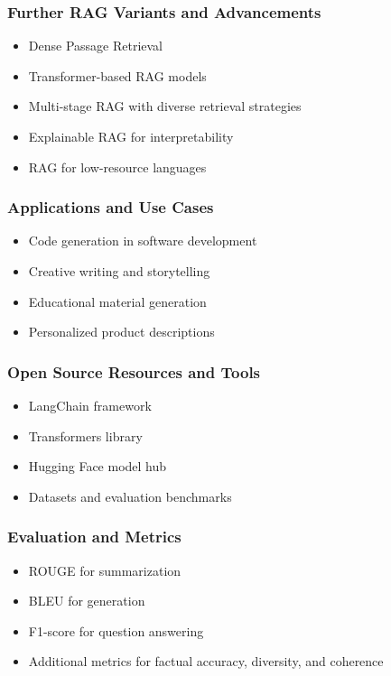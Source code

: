 \begin{frame}[fragile]\frametitle{Further RAG Variants and Advancements}

\begin{itemize}
\item Dense Passage Retrieval
\item Transformer-based RAG models
\item Multi-stage RAG with diverse retrieval strategies
\item Explainable RAG for interpretability
\item RAG for low-resource languages
\end{itemize}	

\end{frame}

\begin{frame}[fragile]\frametitle{Applications and Use Cases}

\begin{itemize}
\item Code generation in software development
\item Creative writing and storytelling
\item Educational material generation
\item Personalized product descriptions
\end{itemize}	

\end{frame}


\begin{frame}[fragile]\frametitle{Open Source Resources and Tools}

\begin{itemize}
\item LangChain framework
\item Transformers library
\item Hugging Face model hub
\item Datasets and evaluation benchmarks
\end{itemize}	

\end{frame}

\begin{frame}[fragile]\frametitle{Evaluation and Metrics}

\begin{itemize}
\item ROUGE for summarization
\item BLEU for generation
\item F1-score for question answering
\item Additional metrics for factual accuracy, diversity, and coherence
\end{itemize}	

\end{frame}


